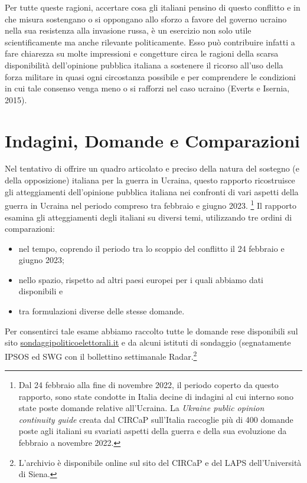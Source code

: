 \documentclass[
]{book}
\begin{document}
Per tutte queste ragioni, accertare cosa gli italiani pensino di questo conflitto e in che misura sostengano o si oppongano allo sforzo a favore del governo ucraino nella sua resistenza alla invasione russa, è un esercizio non solo utile scientificamente ma anche rilevante politicamente. Esso può contribuire infatti a fare chiarezza su molte impressioni e congetture circa le ragioni della scarsa disponibilità dell'opinione pubblica italiana a sostenere il ricorso all'uso della forza militare in quasi ogni circostanza possibile e per comprendere le condizioni in cui tale consenso venga meno o si rafforzi nel caso ucraino (Everts e Isernia, 2015).

\hypertarget{indagini-domande-e-comparazioni}{%
\section{Indagini, Domande e Comparazioni}\label{indagini-domande-e-comparazioni}}

Nel tentativo di offrire un quadro articolato e preciso della natura del sostegno (e della opposizione) italiana per la guerra in Ucraina, questo rapporto ricostruisce gli atteggiamenti dell'opinione pubblica italiana nei confronti di vari aspetti della guerra in Ucraina nel periodo compreso tra febbraio e giugno 2023. \footnote{Dal 24 febbraio alla fine di novembre 2022, il periodo coperto da questo rapporto, sono state condotte in Italia decine di indagini al cui interno sono state poste domande relative all'Ucraina. La \emph{Ukraine public opinion continuity guide} creata dal CIRCaP sull'Italia raccoglie più di 400 domande poste agli italiani su svariati aspetti della guerra e della sua evoluzione da febbraio a novembre 2022.} Il rapporto esamina gli atteggiamenti degli italiani su diversi temi, utilizzando tre ordini di comparazioni:

\begin{itemize}
\item
  nel tempo, coprendo il periodo tra lo scoppio del conflitto il 24 febbraio e giugno 2023;
\item
  nello spazio, rispetto ad altri paesi europei per i quali abbiamo dati disponibili e
\item
  tra formulazioni diverse delle stesse domande.
\end{itemize}

Per consentirci tale esame abbiamo raccolto tutte le domande rese disponibili sul sito \href{http://www.sondaggipoliticoelettorali.it/}{sondaggipoliticoelettorali.it} e da alcuni istituti di sondaggio (segnatamente IPSOS ed SWG con il bollettino settimanale Radar.\footnote{L'archivio è disponibile online sul sito del CIRCaP e del LAPS dell'Università di Siena.}
\end{document}
